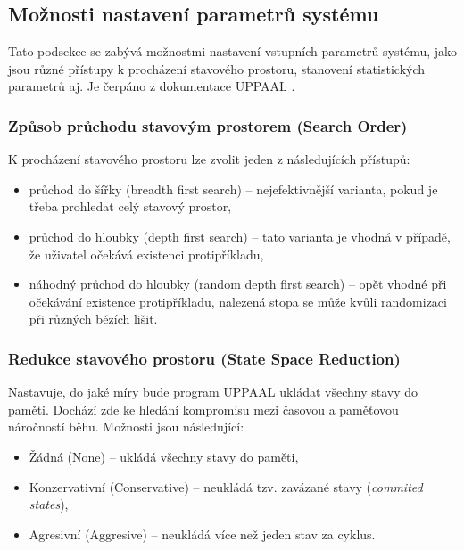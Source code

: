 \subsection{Možnosti nastavení parametrů systému}
Tato podsekce se zabývá možnostmi nastavení vstupních parametrů systému, jako jsou různé přístupy k procházení stavového prostoru, stanovení statistických parametrů aj. Je čerpáno z dokumentace UPPAAL \cite{uppaal_doc}.

\subsubsection{Způsob průchodu stavovým prostorem (Search Order)}
K procházení stavového prostoru lze zvolit jeden z následujících přístupů:
\begin{itemize}
    \item průchod do šířky (breadth first search) -- nejefektivnější varianta, pokud je třeba prohledat celý stavový prostor,
    \item průchod do hloubky (depth first search) -- tato varianta je vhodná v případě, že uživatel očekává existenci protipříkladu,
    \item náhodný průchod do hloubky (random depth first search) -- opět vhodné při očekávání existence protipříkladu, nalezená stopa se může kvůli randomizaci při různých bězích lišit.
\end{itemize}

\subsubsection{Redukce stavového prostoru (State Space Reduction)}
Nastavuje, do jaké míry bude program UPPAAL ukládat všechny stavy do paměti. Dochází zde ke hledání kompromisu mezi časovou a paměťovou náročností běhu. Možnosti jsou následující:
\begin{itemize}
    \item Žádná (None) -- ukládá všechny stavy do paměti,
    \item Konzervativní (Conservative) -- neukládá tzv. zavázané stavy (\textit{commited states}),
    \item Agresivní (Aggresive) -- neukládá více než jeden stav za cyklus.
\end{itemize}

